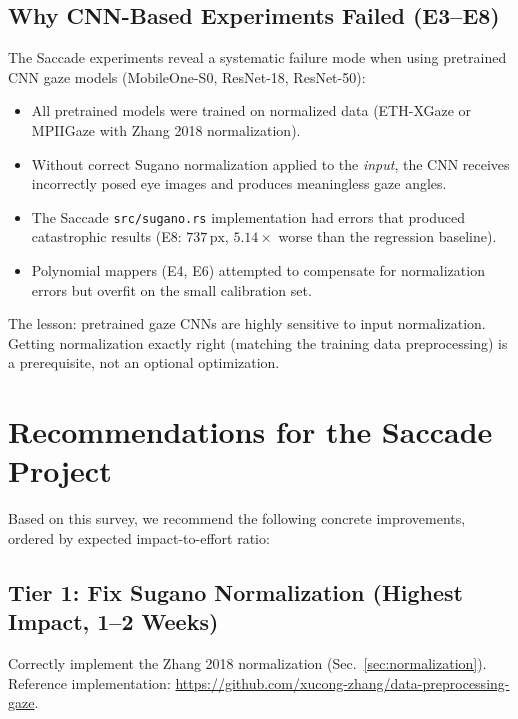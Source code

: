 \documentclass[11pt,a4paper]{article}
\begin{document}
\subsection{Why CNN-Based Experiments Failed (E3--E8)}

The Saccade experiments reveal a systematic failure mode when using pretrained CNN gaze models (MobileOne-S0, ResNet-18, ResNet-50):
\begin{itemize}
  \item All pretrained models were trained on normalized data (ETH-XGaze or MPIIGaze with Zhang 2018 normalization).
  \item Without correct Sugano normalization applied to the \textit{input}, the CNN receives incorrectly posed eye images and produces meaningless gaze angles.
  \item The Saccade \texttt{src/sugano.rs} implementation had errors that produced catastrophic results (E8: $737\,\text{px}$, $5.14\times$ worse than the regression baseline).
  \item Polynomial mappers (E4, E6) attempted to compensate for normalization errors but overfit on the small calibration set.
\end{itemize}

The lesson: pretrained gaze CNNs are highly sensitive to input normalization. Getting normalization exactly right (matching the training data preprocessing) is a prerequisite, not an optional optimization.

\section{Recommendations for the Saccade Project}
\label{sec:recommendations}

Based on this survey, we recommend the following concrete improvements, ordered by expected impact-to-effort ratio:

\subsection{Tier 1: Fix Sugano Normalization (Highest Impact, 1--2 Weeks)}

Correctly implement the Zhang 2018 normalization (Sec.~\ref{sec:normalization}).
Reference implementation: \url{https://github.com/xucong-zhang/data-preprocessing-gaze}.
\end{document}
